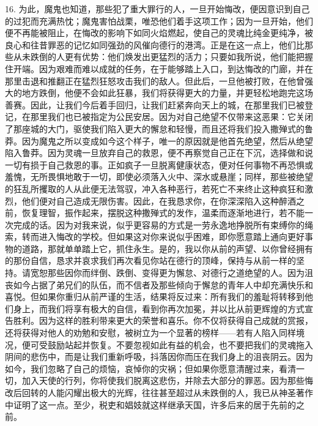 16. 为此，魔鬼也知道，那些犯了重大罪行的人，一旦开始悔改，便因意识到自己的过犯而充满热忱；魔鬼害怕战栗，唯恐他们着手这项工作；因为一旦开始，他们便不再能被阻止，在悔改的影响下如同火焰燃起，使自己的灵魂比纯金更纯净，被良心和往昔罪恶的记忆如同强劲的风催向德行的港湾。正是在这一点上，他们比那些从未跌倒的人更有优势：他们焕发出更猛烈的活力；只要如我所说，他们能把握住开端。因为艰难而难以成就的任务，在于能够踏上入口，到达悔改的门廊，并在那里击退和推翻正在猛烈狂怒攻击我们的敌人。但此后，一旦他被打败，在他曾强大的地方跌倒，他便不会如此狂暴，我们将获得更大的力量，并更轻松地跑完这场善赛。因此，让我们今后着手回归，让我们赶紧奔向天上的城，在那里我们已被登记，在那里我们也已被指定为公民安居。因为对自己绝望不仅带来这恶果：它关闭了那座城的大门，驱使我们陷入更大的懈怠和轻慢，而且还将我们投入撒殚式的鲁莽。因为魔鬼之所以变成如今这个样子，唯一的原因就是他首先绝望，然后从绝望陷入鲁莽。因为灵魂一旦放弃自己的救恩，便不再察觉自己正在下沉，选择做和说一切有损于自己救恩的事。正如疯子一旦脱离健康状态，便对任何事物不再恐惧或羞愧，无所畏惧地敢于一切，即使必须落入火中、深水或悬崖；同样，那些被绝望的狂乱所攫取的人从此便无法驾驭，冲入各种恶行，若死亡不来终止这种疯狂和激烈，他们便对自己造成无限伤害。因此，在我恳求你，在你深深陷入这种醉酒之前，恢复理智，振作起来，摆脱这种撒殚式的发作，温柔而逐渐地进行，若不能一次完成的话。因为对我来说，似乎更容易的方式是一劳永逸地挣脱所有束缚你的绳索，转而进入悔改的学校。但如果这对你来说似乎困难，即你愿意踏上通向更好事物的道路，那就单单踏上它，抓住永生。是的，我以你从前的声望、以你曾经拥有的那份自信，恳求并哀求我们再次看见你站在德行的顶峰，保持与从前一样的坚持。请宽恕那些因你而绊倒、跌倒、变得更为懈怠、对德行之道绝望的人。因为沮丧如今占据了弟兄们的队伍，而不信者及那些倾向于懈怠的青年人中却充满快乐和喜悦。但如果你重归从前严谨的生活，结果将反过来：所有我们的羞耻将转移到他们身上，而我们将享有极大的自信，看到你再次加冕，并以比从前更辉煌的方式宣告胜利。因为这样的胜利带来更大的荣誉和喜乐。你不仅将获得自己成就的赏报，还将获得对他人的劝勉和安慰，被树立为一个显著的榜样——若有人陷入同样境况，便可受鼓励站起并恢复。不要忽视如此有益的机会，也不要把我们的灵魂拖入阴间的悲伤中，而是让我们重新呼吸，抖落因你而压在我们身上的沮丧阴云。因为如今，我们忽略了自己的烦恼，哀悼你的灾祸；但如果你愿意清醒过来，看清一切，加入天使的行列，你将使我们脱离这悲伤，并除去大部分的罪恶。因为那些悔改后回转的人能闪耀出极大的光辉，往往甚至超过从未跌倒的人，我已从神圣著作中证明了这一点。至少，税吏和娼妓就这样继承天国，许多后来的居于先前的之前。\par

